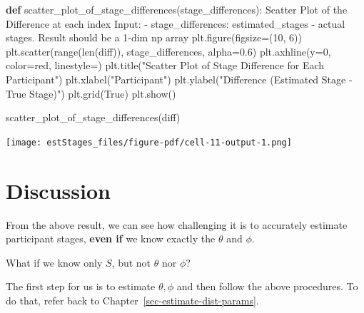 \documentclass[
  letterpaper,
  DIV=11,
  numbers=noendperiod]{scrreprt}
\newenvironment{Shaded}{\begin{snugshade}}{\end{snugshade}}
\newcommand{\BuiltInTok}[1]{\textcolor[rgb]{0.00,0.23,0.31}{#1}}
\newcommand{\CommentTok}[1]{\textcolor[rgb]{0.37,0.37,0.37}{#1}}
\newcommand{\DecValTok}[1]{\textcolor[rgb]{0.68,0.00,0.00}{#1}}
\newcommand{\FloatTok}[1]{\textcolor[rgb]{0.68,0.00,0.00}{#1}}
\newcommand{\KeywordTok}[1]{\textcolor[rgb]{0.00,0.23,0.31}{\textbf{#1}}}
\newcommand{\NormalTok}[1]{\textcolor[rgb]{0.00,0.23,0.31}{#1}}
\newcommand{\OperatorTok}[1]{\textcolor[rgb]{0.37,0.37,0.37}{#1}}
\newcommand{\StringTok}[1]{\textcolor[rgb]{0.13,0.47,0.30}{#1}}
\newcommand{\VariableTok}[1]{\textcolor[rgb]{0.07,0.07,0.07}{#1}}
\begin{document}
\begin{Shaded}
\begin{Highlighting}[]
\KeywordTok{def}\NormalTok{ scatter\_plot\_of\_stage\_differences(stage\_differences):}
    \CommentTok{\textquotesingle{}\textquotesingle{}\textquotesingle{}Scatter Plot of the Difference at each index}
\CommentTok{    Input:}
\CommentTok{    {-} stage\_differences: estimated\_stages {-} actual stages. Result should be a 1{-}dim np array}
\CommentTok{    \textquotesingle{}\textquotesingle{}\textquotesingle{}}
\NormalTok{    plt.figure(figsize}\OperatorTok{=}\NormalTok{(}\DecValTok{10}\NormalTok{, }\DecValTok{6}\NormalTok{))}
\NormalTok{    plt.scatter(}\BuiltInTok{range}\NormalTok{(}\BuiltInTok{len}\NormalTok{(diff)), stage\_differences, alpha}\OperatorTok{=}\FloatTok{0.6}\NormalTok{)}
\NormalTok{    plt.axhline(y}\OperatorTok{=}\DecValTok{0}\NormalTok{, color}\OperatorTok{=}\StringTok{\textquotesingle{}red\textquotesingle{}}\NormalTok{, linestyle}\OperatorTok{=}\StringTok{\textquotesingle{}{-}{-}\textquotesingle{}}\NormalTok{)}
\NormalTok{    plt.title(}\StringTok{"Scatter Plot of Stage Difference for Each Participant"}\NormalTok{)}
\NormalTok{    plt.xlabel(}\StringTok{"Participant"}\NormalTok{)}
\NormalTok{    plt.ylabel(}\StringTok{"Difference (Estimated Stage {-} True Stage)"}\NormalTok{)}
\NormalTok{    plt.grid(}\VariableTok{True}\NormalTok{)}
\NormalTok{    plt.show()}
\end{Highlighting}
\end{Shaded}

\begin{Shaded}
\begin{Highlighting}[]
\NormalTok{scatter\_plot\_of\_stage\_differences(diff)}
\end{Highlighting}
\end{Shaded}

\texttt{[image: estStages\_files/figure-pdf/cell-11-output-1.png]}

\section{Discussion}\label{discussion}

From the above result, we can see how challenging it is to accurately
estimate participant stages, \textbf{even if} we know exactly the
\(\theta\) and \(\phi\).

\begin{tcolorbox}[enhanced jigsaw, bottomrule=.15mm, colback=white, bottomtitle=1mm, titlerule=0mm, arc=.35mm, breakable, rightrule=.15mm, opacityback=0, leftrule=.75mm, opacitybacktitle=0.6, colframe=quarto-callout-tip-color-frame, coltitle=black, toptitle=1mm, colbacktitle=quarto-callout-tip-color!10!white, title=\textcolor{quarto-callout-tip-color}{\faLightbulb}\hspace{0.5em}{Tip}, left=2mm, toprule=.15mm]

What if we know only \(S\), but not \(\theta\) nor \(\phi\)?

The first step for us is to estimate \(\theta, \phi\) and then follow
the above procedures. To do that, refer back to
Chapter~\ref{sec-estimate-dist-params}.

\end{tcolorbox}
\end{document}
